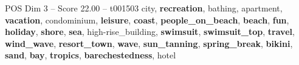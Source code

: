 \begin{textsample}{POS Dim 3 – Score 22.00 – t001503}  \label{ex:f3_pos_014}
city, \textbf{recreation}, bathing, apartment, \textbf{vacation}, condominium, \textbf{leisure}, \textbf{coast}, \textbf{people\_on\_beach}, \textbf{beach}, \textbf{fun}, \textbf{holiday}, \textbf{shore}, \textbf{sea}, high-rise\_building, \textbf{swimsuit}, \textbf{swimsuit\_top}, \textbf{travel}, \textbf{wind\_wave}, \textbf{resort\_town}, \textbf{wave}, \textbf{sun\_tanning}, \textbf{spring\_break}, \textbf{bikini}, \textbf{sand}, \textbf{bay}, \textbf{tropics}, \textbf{barechestedness}, hotel

\end{textsample}
